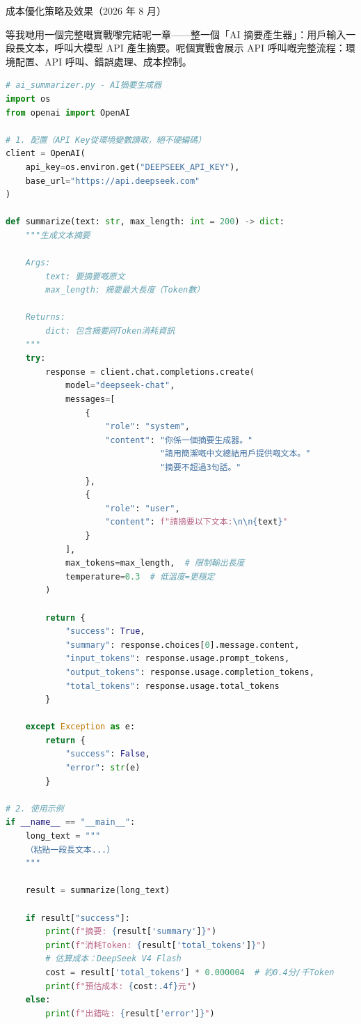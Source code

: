 \begin{center}\small\color{gray}成本優化策略及效果（2026 年 8 月）\end{center}


等我哋用一個完整嘅實戰嚟完結呢一章——整一個「AI 摘要產生器」：用戶輸入一段長文本，呼叫大模型 API 產生摘要。呢個實戰會展示 API 呼叫嘅完整流程：環境配置、API 呼叫、錯誤處理、成本控制。

\begin{lstlisting}[language=Python]
# ai_summarizer.py - AI摘要生成器
import os
from openai import OpenAI

# 1. 配置（API Key從環境變數讀取，絕不硬編碼）
client = OpenAI(
    api_key=os.environ.get("DEEPSEEK_API_KEY"),
    base_url="https://api.deepseek.com"
)

def summarize(text: str, max_length: int = 200) -> dict:
    """生成文本摘要

    Args:
        text: 要摘要嘅原文
        max_length: 摘要最大長度（Token數）

    Returns:
        dict: 包含摘要同Token消耗資訊
    """
    try:
        response = client.chat.completions.create(
            model="deepseek-chat",
            messages=[
                {
                    "role": "system",
                    "content": "你係一個摘要生成器。"
                               "請用簡潔嘅中文總結用戶提供嘅文本。"
                               "摘要不超過3句話。"
                },
                {
                    "role": "user",
                    "content": f"請摘要以下文本:\n\n{text}"
                }
            ],
            max_tokens=max_length,  # 限制輸出長度
            temperature=0.3  # 低溫度=更穩定
        )

        return {
            "success": True,
            "summary": response.choices[0].message.content,
            "input_tokens": response.usage.prompt_tokens,
            "output_tokens": response.usage.completion_tokens,
            "total_tokens": response.usage.total_tokens
        }

    except Exception as e:
        return {
            "success": False,
            "error": str(e)
        }

# 2. 使用示例
if __name__ == "__main__":
    long_text = """
    （粘貼一段長文本...）
    """

    result = summarize(long_text)

    if result["success"]:
        print(f"摘要: {result['summary']}")
        print(f"消耗Token: {result['total_tokens']}")
        # 估算成本：DeepSeek V4 Flash
        cost = result['total_tokens'] * 0.000004  # 約0.4分/千Token
        print(f"預估成本: {cost:.4f}元")
    else:
        print(f"出錯咗: {result['error']}")
\end{lstlisting}

